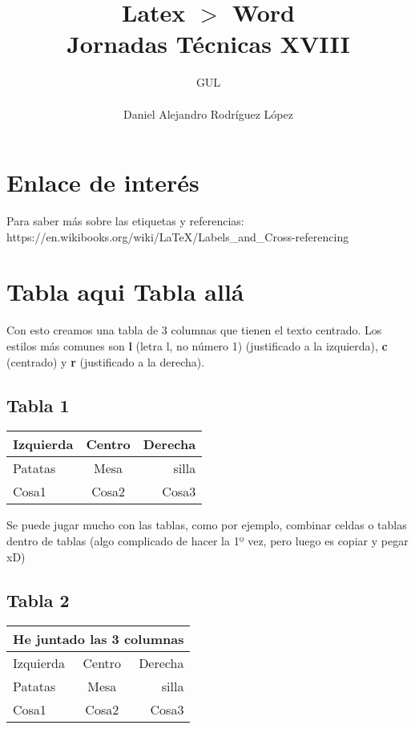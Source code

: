 \documentclass[10pt,a4paper,titlepage]{article} %
\title{ \textbf{ \Huge{Latex $>$ Word}} \\ Jornadas Técnicas XVIII}
\author{
		\begin{tabular}{l}
			\multicolumn{1}{l}{GUL} \\ \hline \\
			Daniel Alejandro Rodríguez López \\
		\end{tabular}
}
\begin{document}
\maketitle
\newpage

\tableofcontents
\newpage

	\section*{Enlace de interés}
		Para saber más sobre las etiquetas y referencias: https://en.wikibooks.org/wiki/LaTeX/Labels_and_Cross-referencing

	\section{Tabla aqui Tabla allá}
	\label{sec:enl}
	Con esto creamos una tabla de 3 columnas que tienen el texto centrado. Los estilos más comunes son \textbf{l} (letra l, no número 1) (justificado a la izquierda), \textbf{c} (centrado) y \textbf{r} (justificado a la derecha). 

		\subsection{Tabla 1}
		\begin{center}
		\begin{tabular}{l c r}
		Izquierda & Centro & Derecha \\ \hline
		Patatas & Mesa & silla \\
		Cosa1 & Cosa2 & Cosa3 \\ \hline
		\end{tabular}
		\end{center}


		Se puede jugar mucho con las tablas, como por ejemplo, combinar celdas o tablas dentro de tablas (algo complicado de hacer la 1º vez, pero luego es copiar y pegar xD)

		\newpage
		\subsection{Tabla 2}
		\begin{center}
		\begin{tabular}{l c r}
		\multicolumn{3}{c}{He juntado las 3 columnas} \\ \hline
		Izquierda & Centro & Derecha \\ \hline
		Patatas & Mesa & silla \\
		Cosa1 & Cosa2 & Cosa3 \\ \hline
		\end{tabular}
		\end{center}
\end{document}
